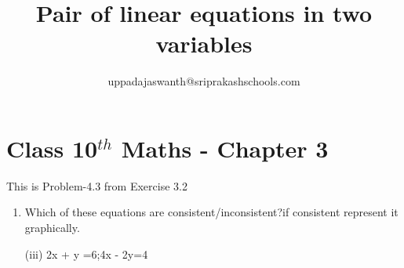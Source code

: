\documentclass[12pt]{article}
\title{Pair of linear equations in two variables }
\author{uppadajaswanth@sriprakashschools.com}
\begin{document}
\maketitle
\section*{Class 10$^{th}$ Maths - Chapter 3}
This is Problem-4.3 from Exercise 3.2
\begin{enumerate}
\item Which of these equations are consistent/inconsistent?if consistent represent it graphically.

(iii) 2x + y =6;4x - 2y=4
 \\


\end{enumerate}
\end{document}
